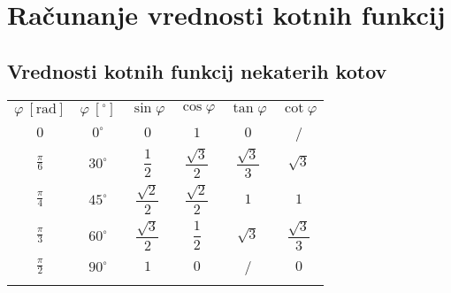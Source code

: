     \section{Računanje vrednosti kotnih funkcij}

        
            \subsection*{Vrednosti kotnih funkcij nekaterih kotov}

            
            
                \begin{table}[H]
                    \centering
                    \addtolength{\tabcolsep}{8pt}
                    \renewcommand{\arraystretch}{2.15}                
                    \begin{tabular}{||c|c||c|c|c|c||} 
                        \hhline{|t:==:t:====:t|}
                        \rowcolor[rgb]{0.863,0.745,0.745}  
                                $\varphi~\left[\textrm{rad}\right] $ & $\varphi~\left[^\circ\right] $ & $\sin\varphi$ & $\cos\varphi$ & $\tan\varphi$ & $\cot\varphi$  \\ 
                        \hhline{|:==::====:|}
                                $0$ & $0^\circ$  & $0$ & $1$ & $0$ & /  \\ 
                        \hline
                                $\frac{\pi}{6}$ & $30^\circ$ & $\dfrac{1}{2}$ & $\dfrac{\sqrt{3}}{2}$ & $\dfrac{\sqrt{3}}{3}$ & $\sqrt{3}$  \\ 
                        \hline
                                $\frac{\pi}{4}$ & $45^\circ$ & $\dfrac{\sqrt{2}}{2}$ & $\dfrac{\sqrt{2}}{2}$ & $1$ & $1$  \\ 
                        \hline
                                $\frac{\pi}{3}$ & $60^\circ$ & $\dfrac{\sqrt{3}}{2}$ & $\dfrac{1}{2}$ & $\sqrt{3}$ & $\dfrac{\sqrt{3}}{3}$  \\ 
                        \hline
                                $\frac{\pi}{2}$ & $90^\circ$ & $1$ & $0$ & / & $0$  \\  
                        \hhline{|b:==:b:====:b|}
                    \end{tabular}
                \end{table}
            
